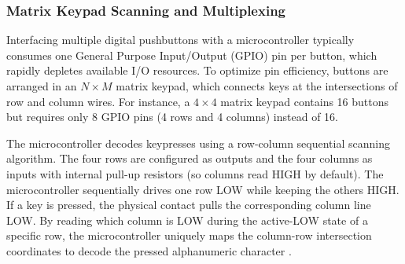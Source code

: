 \subsubsection{Matrix Keypad Scanning and Multiplexing}
Interfacing multiple digital pushbuttons with a microcontroller typically consumes one General Purpose Input/Output (GPIO) pin per button, which rapidly depletes available I/O resources. To optimize pin efficiency, buttons are arranged in an $N \times M$ matrix keypad, which connects keys at the intersections of row and column wires. For instance, a $4 \times 4$ matrix keypad contains 16 buttons but requires only 8 GPIO pins (4 rows and 4 columns) instead of 16.

The microcontroller decodes keypresses using a row-column sequential scanning algorithm. The four rows are configured as outputs and the four columns as inputs with internal pull-up resistors (so columns read HIGH by default). The microcontroller sequentially drives one row LOW while keeping the others HIGH. If a key is pressed, the physical contact pulls the corresponding column line LOW. By reading which column is LOW during the active-LOW state of a specific row, the microcontroller uniquely maps the column-row intersection coordinates to decode the pressed alphanumeric character \cite{achary2025}.

%
%


